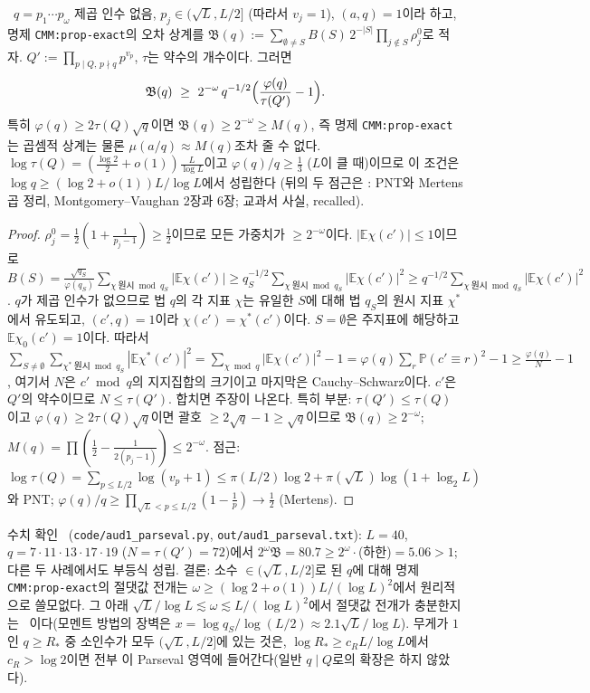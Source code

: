 \begin{proposition}\label{AUD1:prop-parseval}
\PROVED\ $q=p_1\cdots p_\omega$ 제곱 인수 없음, $p_j\in(\sqrt L,L/2]$ (따라서 $v_j=1$), $(a,q)=1$이라 하고, 명제 \texttt{CMM:prop-exact}의 오차 상계를
$\mathfrak B(q):=\sum_{\emptyset\ne S}B(S)\,2^{-|S|}\prod_{j\notin S}\rho^0_j$로 적자. $Q':=\prod_{p\mid Q,\,p\nmid q}p^{v_p}$, $\tau$는 약수의 개수이다. 그러면
\[
\mathfrak B(q)\ \ge\ 2^{-\omega}\,q^{-1/2}\Bigl(\frac{\varphi(q)}{\tau(Q')}-1\Bigr).
\]
특히 $\varphi(q)\ge2\tau(Q)\sqrt q$이면 $\mathfrak B(q)\ge2^{-\omega}\ge M(q)$, 즉 명제 \texttt{CMM:prop-exact}는 곱셈적 상계는 물론 $\mu(a/q)\approx M(q)$조차 줄 수 없다.
$\log\tau(Q)=(\frac{\log2}2+o(1))\frac L{\log L}$이고 $\varphi(q)/q\ge\frac13$ ($L$이 클 때)이므로 이 조건은 $\log q\ge(\log2+o(1))L/\log L$에서 성립한다
(뒤의 두 점근은 \EXT: PNT와 Mertens 곱 정리, Montgomery--Vaughan 2장과 6장; 교과서 사실, recalled).
\end{proposition}
\begin{proof}
$\rho^0_j=\frac12(1+\frac1{p_j-1})\ge\frac12$이므로 모든 가중치가 $\ge2^{-\omega}$이다. $|\mathbb E\chi(c')|\le1$이므로
$B(S)=\frac{\sqrt{q_S}}{\varphi(q_S)}\sum_{\chi\ \text{원시}\bmod q_S}|\mathbb E\chi(c')|\ge q_S^{-1/2}\sum_{\chi\ \text{원시}\bmod q_S}|\mathbb E\chi(c')|^2\ge q^{-1/2}\sum_{\chi\ \text{원시}\bmod q_S}|\mathbb E\chi(c')|^2$.
$q$가 제곱 인수가 없으므로 법 $q$의 각 지표 $\chi$는 유일한 $S$에 대해 법 $q_S$의 원시 지표 $\chi^*$에서 유도되고, $(c',q)=1$이라 $\chi(c')=\chi^*(c')$이다.
$S=\emptyset$은 주지표에 해당하고 $\mathbb E\chi_0(c')=1$이다. 따라서
$\sum_{S\ne\emptyset}\sum_{\chi^*\ \text{원시}\bmod q_S}|\mathbb E\chi^*(c')|^2=\sum_{\chi\bmod q}|\mathbb E\chi(c')|^2-1=\varphi(q)\sum_r\mathbb P(c'\equiv r)^2-1\ge\frac{\varphi(q)}{N}-1$,
여기서 $N$은 $c'\bmod q$의 지지집합의 크기이고 마지막은 Cauchy--Schwarz이다. $c'$은 $Q'$의 약수이므로 $N\le\tau(Q')$. 합치면 주장이 나온다.
특히 부분: $\tau(Q')\le\tau(Q)$이고 $\varphi(q)\ge2\tau(Q)\sqrt q$이면 괄호 $\ge2\sqrt q-1\ge\sqrt q$이므로 $\mathfrak B(q)\ge2^{-\omega}$; $M(q)=\prod(\frac12-\frac1{2(p_j-1)})\le2^{-\omega}$.
점근: $\log\tau(Q)=\sum_{p\le L/2}\log(v_p+1)\le\pi(L/2)\log2+\pi(\sqrt L)\log(1+\log_2L)$와 PNT; $\varphi(q)/q\ge\prod_{\sqrt L<p\le L/2}(1-\frac1p)\to\frac12$ (Mertens).
\end{proof}
수치 확인 \NUMERIC\ (\texttt{code/aud1\_parseval.py}, \texttt{out/aud1\_parseval.txt}): $L=40$, $q=7\cdot11\cdot13\cdot17\cdot19$ ($N=\tau(Q')=72$)에서
$2^\omega\mathfrak B=80.7\ge2^\omega\cdot$(하한)$=5.06>1$; 다른 두 사례에서도 부등식 성립.
결론: 소수 $\in(\sqrt L,L/2]$로 된 $q$에 대해 명제 \texttt{CMM:prop-exact}의 절댓값 전개는 $\omega\ge(\log2+o(1))L/(\log L)^2$에서 원리적으로 쓸모없다.
그 아래 $\sqrt L/\log L\lesssim\omega\lesssim L/(\log L)^2$에서 절댓값 전개가 충분한지는 \OPEN\ 이다(모멘트 방법의 장벽은 $x=\log q_S/\log(L/2)\approx2.1\sqrt L/\log L$).
무게가 $1$인 $q\ge R_*$ 중 소인수가 모두 $(\sqrt L,L/2]$에 있는 것은, $\log R_*\ge c_RL/\log L$에서 $c_R>\log2$이면 전부 이 Parseval 영역에 들어간다(일반 $q\mid Q$로의 확장은 하지 않았다).

